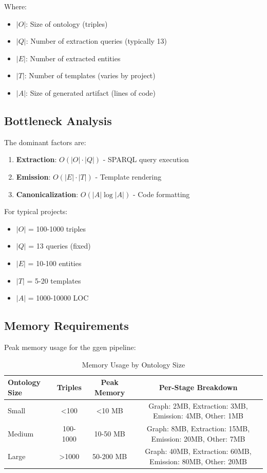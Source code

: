 Where:
\begin{itemize}
    \item \(|O|\): Size of ontology (triples)
    \item \(|Q|\): Number of extraction queries (typically 13)
    \item \(|E|\): Number of extracted entities
    \item \(|T|\): Number of templates (varies by project)
    \item \(|A|\): Size of generated artifact (lines of code)
\end{itemize}

\subsection{Bottleneck Analysis}

The dominant factors are:
\begin{enumerate}
    \item \textbf{Extraction}: \(O(|O| \cdot |Q|)\) - SPARQL query execution
    \item \textbf{Emission}: \(O(|E| \cdot |T|)\) - Template rendering
    \item \textbf{Canonicalization}: \(O(|A| \log |A|)\) - Code formatting
\end{enumerate}

For typical projects:
\begin{itemize}
    \item \(|O|\) = 100-1000 triples
    \item \(|Q|\) = 13 queries (fixed)
    \item \(|E|\) = 10-100 entities
    \item \(|T|\) = 5-20 templates
    \item \(|A|\) = 1000-10000 LOC
\end{itemize}

\subsection{Memory Requirements}

Peak memory usage for the ggen pipeline:

\begin{table}[h]
\centering
\caption{Memory Usage by Ontology Size}
\begin{tabular}{lccc}
\toprule
\textbf{Ontology Size} & \textbf{Triples} & \textbf{Peak Memory} & \textbf{Per-Stage Breakdown} \\
\midrule
Small & <100 & <10 MB & Graph: 2MB, Extraction: 3MB, Emission: 4MB, Other: 1MB \\
Medium & 100-1000 & 10-50 MB & Graph: 8MB, Extraction: 15MB, Emission: 20MB, Other: 7MB \\
Large & >1000 & 50-200 MB & Graph: 40MB, Extraction: 60MB, Emission: 80MB, Other: 20MB \\
\bottomrule
\end{tabular}
\end{table}

